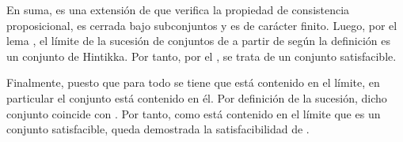 \begin{isabellebody}
\begin{isamarkuptext}
\begin{demostracion}
    En suma,  es una extensión de  que verifica la propiedad de consistencia proposicional, 
    es cerrada bajo subconjuntos y es de carácter finito. Luego, por el lema , el límite de 
    la sucesión  de conjuntos de  a partir de  según la definición  es un 
    conjunto de Hintikka. Por tanto, por el , se trata de un conjunto 
    satisfacible. 

    Finalmente, puesto que para todo  se tiene que  está contenido en el límite, en 
    particular el conjunto  está contenido en él. Por definición de la sucesión, dicho conjunto 
    coincide con . Por tanto, como  está contenido en el límite que es un conjunto 
    satisfacible, queda demostrada la satisfacibilidad de .
  \end{demostracion}


\end{isamarkuptext}
\end{isabellebody}
